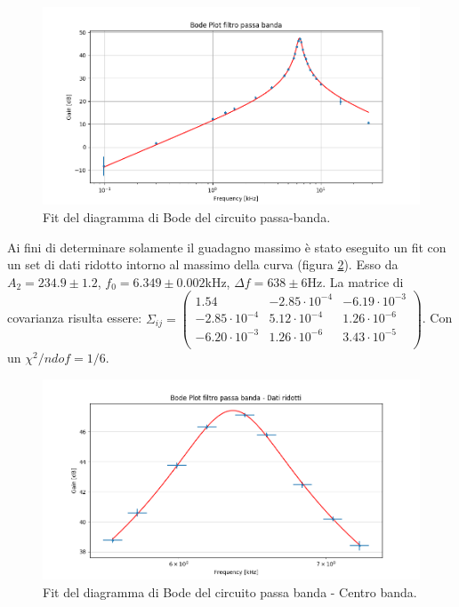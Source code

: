 \documentclass[10pt,a4paper]{article}
\begin{document}
\begin{figure}[!htb]
\centering
\includegraphics[scale=.7]{passabanda.png}
\caption{Fit del diagramma di Bode del circuito passa-banda.\label{bandaFit}}
\end{figure}

Ai fini di determinare solamente il guadagno massimo è stato eseguito un fit con un set di dati ridotto intorno al massimo della curva (figura \ref{bandaFitRidotta}). Esso da $A_2 = 234.9 \pm 1.2$, $f_0 = 6.349 \pm 0.002$kHz, $\Delta f = 638 \pm 6$Hz. La matrice di covarianza risulta essere: $ \Sigma_{ij} = \left( \begin{array}{ccc}
1.54 & -2.85 \cdot 10^{-4} & -6.19 \cdot 10^{-3}\\ 
-2.85 \cdot 10^{-4} & 5.12 \cdot 10^{-4} & 1.26 \cdot 10^{-6}\\
-6.20 \cdot 10^{-3} & 1.26 \cdot 10^{-6} & 3.43 \cdot 10^{-5}\\
\end{array} \right)$. Con un $\chi^2/ndof = 1/6$.\\

\begin{figure}[!htb]
\centering
\includegraphics[scale=.7]{passaBandaRidotto.png}
\caption{Fit del diagramma di Bode del circuito passa banda - Centro banda.\label{bandaFitRidotta}}
\end{figure}
\end{document}
